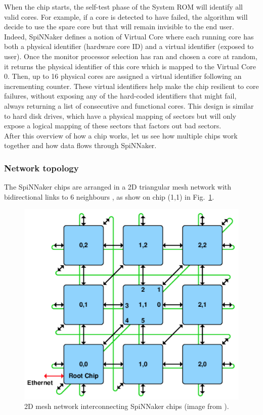 When the chip starts, the self-test phase of the System ROM will identify all valid cores. For example, if a core is detected to have failed, the algorithm will decide to use the spare core but that will remain invisible to the end user. Indeed, SpiNNaker defines a notion of Virtual Core \cite{vcpu} where each running core has both a physical identifier (hardware core ID) and a virtual identifier (exposed to user). Once the monitor processor selection has ran and chosen a core at random, it returns the physical identifier of this core which is mapped to the Virtual Core 0. Then, up to 16 physical cores are assigned a virtual identifier following an incrementing counter. These virtual identifiers help make the chip resilient to core failures, without exposing any of the hard-coded identifiers that might fail, always returning a list of consecutive and functional cores. This design is similar to hard disk drives, which have a physical mapping of sectors but will only expose a logical mapping of these sectors that factors out bad sectors. \\

After this overview of how a chip works, let us see how multiple chips work together and how data flows through SpiNNaker. 

\subsubsection{Network topology} \label{sec:nw}

The SpiNNaker chips are arranged in a 2D triangular mesh network with bidirectional links to 6 neighbours \cite{testchip}, as show on chip (1,1) in Fig.~\ref{fig:mesh}.

\begin{figure}[hbtp]
\centering
\includegraphics[width = 0.8\hsize]{figures/mesh.png}
\caption{2D mesh network interconnecting SpiNNaker chips (image from \cite{mesh_img}).}
\label{fig:mesh}
\end{figure}


